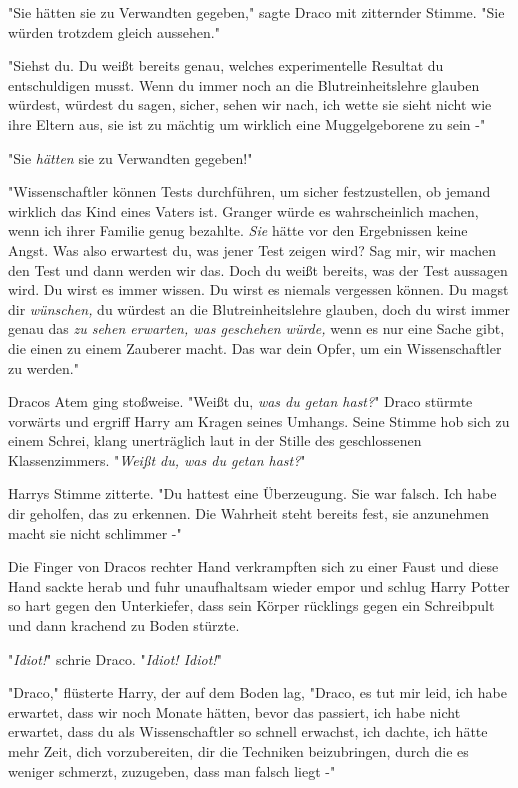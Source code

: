 {"Sie hätten sie zu Verwandten gegeben," sagte Draco mit zitternder Stimme. "Sie würden trotzdem gleich aussehen."

"Siehst du. Du weißt bereits genau, welches experimentelle Resultat du entschuldigen musst. Wenn du immer noch an die Blutreinheitslehre glauben würdest, würdest du sagen, sicher, sehen wir nach, ich wette sie sieht nicht wie ihre Eltern aus, sie ist zu mächtig um wirklich eine Muggelgeborene zu sein -"

"Sie \emph{hätten} sie zu Verwandten gegeben!"

"Wissenschaftler können Tests durchführen, um sicher festzustellen, ob jemand wirklich das Kind eines Vaters ist. Granger würde es wahrscheinlich machen, wenn ich ihrer Familie genug bezahlte. \emph{Sie} hätte vor den Ergebnissen keine Angst. Was also erwartest du, was jener Test zeigen wird? Sag mir, wir machen den Test und dann werden wir das. Doch du weißt bereits, was der Test aussagen wird. Du wirst es immer wissen. Du wirst es niemals vergessen können. Du magst dir \emph{wünschen,} du würdest an die Blutreinheitslehre glauben, doch du wirst immer genau das \emph{zu sehen erwarten, was geschehen würde,} wenn es nur eine Sache gibt, die einen zu einem Zauberer macht. Das war dein Opfer, um ein Wissenschaftler zu werden."

Dracos Atem ging stoßweise. "Weißt du, \emph{was du getan hast?}" Draco stürmte vorwärts und ergriff Harry am Kragen seines Umhangs. Seine Stimme hob sich zu einem Schrei, klang unerträglich laut in der Stille des geschlossenen Klassenzimmers. "\emph{Weißt du, was du getan hast?}"

Harrys Stimme zitterte. "Du hattest eine Überzeugung. Sie war falsch. Ich habe dir geholfen, das zu erkennen. Die Wahrheit steht bereits fest, sie anzunehmen macht sie nicht schlimmer -"

Die Finger von Dracos rechter Hand verkrampften sich zu einer Faust und diese Hand sackte herab und fuhr unaufhaltsam wieder empor und schlug Harry Potter so hart gegen den Unterkiefer, dass sein Körper rücklings gegen ein Schreibpult und dann krachend zu Boden stürzte.

"\emph{Idiot!}" schrie Draco. "\emph{Idiot! Idiot!}"

"Draco," flüsterte Harry, der auf dem Boden lag, "Draco, es tut mir leid, ich habe erwartet, dass wir noch Monate hätten, bevor das passiert, ich habe nicht erwartet, dass du als Wissenschaftler so schnell erwachst, ich dachte, ich hätte mehr Zeit, dich vorzubereiten, dir die Techniken beizubringen, durch die es weniger schmerzt, zuzugeben, dass man falsch liegt -"

}
